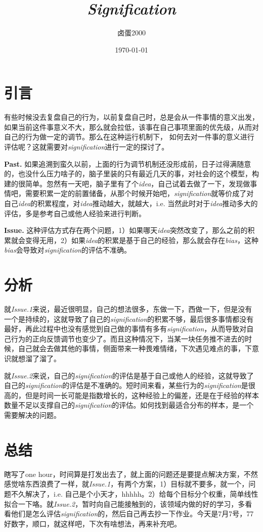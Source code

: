 \documentclass{article}
\title{\textit{Signification}}
\author{卤蛋2000}
\date{\today}
\begin{document}
\maketitle

\section{引言}

有些时候没去复盘自己的行为，以前复盘自己时，总是会从一件事情的意义出发，如果当前这件事意义不大，那么就会拉低，该事在自己事项里面的优先级，从而对自己的行为做一定的调节。那么在这种运行机制下， 如何去对一件事的意义进行评估呢？这就需要对\textit{signification}进行一定的探讨了。

\textbf{Past.} 如果追溯到蛮久以前，上面的行为调节机制还没形成前，日子过得满随意的，也没什么压力啥子的，脑子里装的只有最近几天的事，对社会的这个模型，构建的很简单。忽然有一天吧，脑子里有了个\textit{idea}，自己试着去做了一下，发现做事情吧，需要积累一定的前置储备，从那个时候开始吧，\textit{signification}就等价成了对自己\textit{idea}的积累程度，对\textit{idea}推动越大，就越大，i.e. 当然此时对于\textit{idea}推动多大的评估，多是参考自己或他人经验来进行判断。

\textbf{Issue.} 这种评估方式存在两个问题，1）如果哪天\textit{idea}突然改变了，那么之前的积累就会变得无用，2）如果\textit{idea}的积累是基于自己的经验，那么就会存在\textit{bias}，这种\textit{bias}会导致对\textit{signification}的评估不准确。

\section{分析}
就\textit{Issue.1}来说，最近很明显，自己的想法很多，东做一下，西做一下，但是没有一个是持续的，这就导致了自己的\textit{signification}的积累不够，最后很多事情都没有最好，再此过程中也没有感觉到自己做的事情有多有\textit{signification}，从而导致对自己行为的正向反馈调节也变少了。而且这种情况下，当某一块任务推不进去的时候，自己就会去做其他的事情，侧面带来一种畏难情绪，下次遇见难点的事，下意识就想溜了溜了。

就\textit{Issue.2}来说，自己的\textit{signification}的评估是基于自己或他人的经验，这就导致了自己的\textit{signification}的评估是不准确的。短时间来看，某些行为的\textit{signification}是很高的，但是时间一长可能是指数增长的，这种经验上的偏差，还是在于经验的样本数量不足以支撑自己的\textit{signification}的评估。如何找到最适合分布的样本，是一个需要解决的问题。

\section{总结}
瞎写了one hour，时间算是打发出去了，就上面的问题还是要提点解决方案，不然感觉啥东西浪费了一样，就\textit{Issue.1}，有两个方案，1）目标就不要多，就一个，问题不久解决了，i.e. 自己是个小天才，hhhhh。2）给每个目标分个权重，简单线性拟合一下咯。就\textit{Issue.2}，暂时向自己能接触到的，该领域内做的好的学习，多看看他们是怎么评估\textit{signification}的，然后自己再去抄一下作业。今天是7月7号，77好数字，顺口，就这样吧，下次有啥想法，再来补充吧。
\end{document}
